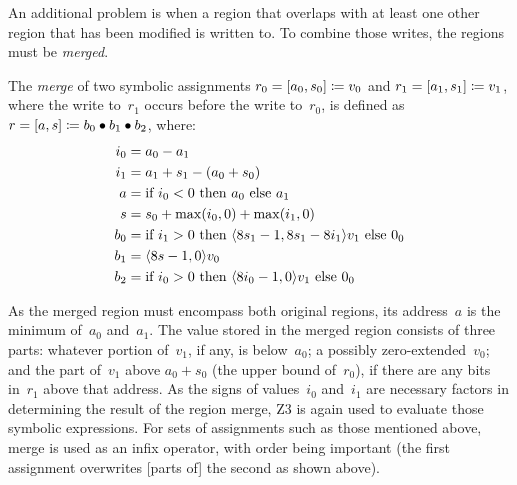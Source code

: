 An additional problem is when a region that overlaps with at least one other region
that has been modified is written to.
To combine those writes, the regions must be \emph{merged}.
\begin{definition}
  The \emph{merge} of two symbolic assignments
  $r_0=[a_0,s_0]\coloneqq v_0$ and $r_1=[a_1,s_1]\coloneqq v_1$,
  where the write to~$r_1$ occurs before the write to~$r_0$,
  is defined as $r=[a,s]\coloneqq b_0\bullet b_1\bullet b_2$, where:
  \begin{align*}
  i_0 &= a_0 - a_1 \\
  i_1 &= a_1 + s_1 - (a_0 + s_0) \\
  a   &= \text{if } i_0 < 0 \text{ then } a_0 \text{ else } a_1 \\
  s   &= s_0 + \max(i_0, 0) + \max(i_1, 0) \\
  b_0 &= \text{if } i_1 > 0 \text{ then } \langle8 s_1-1,8 s_1 - 8 i_1\rangle v_1 \text{ else } 0_0 \\
  b_1 &= \langle8 s-1, 0\rangle v_0 \\
  b_2 &= \text{if } i_0 > 0 \text{ then } \langle8 i_0-1, 0\rangle v_1 \text{ else } 0_0
  \end{align*}
\end{definition}
As the merged region must encompass both original regions,
its address~$a$ is the minimum of~$a_0$ and~$a_1$.
The value stored in the merged region consists of three parts:
whatever portion of~$v_1$, if any, is below~$a_0$;
a possibly zero-extended~$v_0$;
and the part of~$v_1$ above $a_0+s_0$ (the upper bound of~$r_0$),
if there are any bits in~$r_1$ above that address.
As the signs of values~$i_0$ and~$i_1$ are necessary factors
in determining the result of the region merge,
Z3 is again used to evaluate those symbolic expressions.
For sets of assignments such as those mentioned above,
merge is used as an infix operator, with order being important
(the first assignment overwrites [parts of] the second as shown above).

